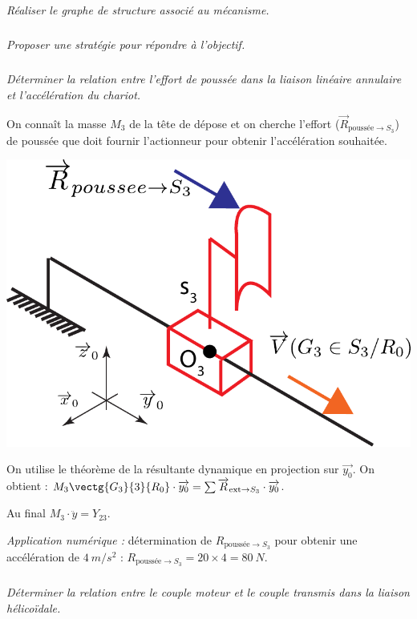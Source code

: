 \begin{multicols}{2}
\subparagraph{}
\textit{Réaliser le graphe de structure associé au mécanisme.}

\subparagraph{}
\textit{Proposer une stratégie pour répondre à l'objectif.}

\subparagraph{}
\textit{Déterminer la relation entre l'effort de poussée dans la liaison linéaire annulaire et l'accélération du chariot.}
\ifprof
\begin{corrige}
On connaît la masse $M_3$ de la tête de dépose et on cherche l'effort ($\overrightarrow{R}_{\text{poussée}\to S_3}$) de poussée que doit fournir l'actionneur pour obtenir l'accélération souhaitée.

\begin{center}
\includegraphics[width=.4\linewidth]{images/schema_cine_depose_translation.pdf}
\end{center}

On utilise le théorème de la résultante dynamique en projection sur $\overrightarrow{y_0}$. On obtient : $
M_3 \vectg{G_3}{3}{R_0}\cdot \overrightarrow{y_0}=\sum \overrightarrow{R}_{\text{ext}\to S_3}\cdot \overrightarrow{y_0}$.
 
Au final $M_3\cdot \ddot{y}=Y_{23}$.


\textit{Application numérique : } détermination de $R_{\text{pouss\'ee}\to S_3}$ pour obtenir une accélération de $\SI{4}{m/s^2}$ : $R_{\text{pouss\'ee}\to S_3}=20\times 4=\SI{80}{N}
$.
\end{corrige}
\else
\fi


\subparagraph{}
\textit{Déterminer la relation entre le couple moteur et le couple transmis dans la liaison hélicoïdale.}



\end{multicols}
